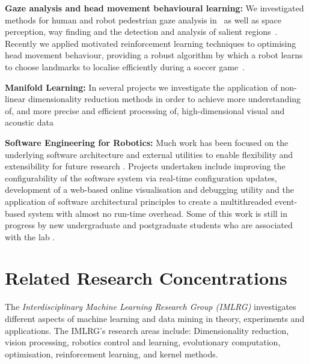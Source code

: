 \documentclass{llncs}
\begin{document}
\noindent\textbf{Gaze analysis and head movement behavioural learning:} We investigated methods for human and robot pedestrian gaze analysis in~\cite{JalalianEtAl_CAADRIA2011,WongEtAl2012} as well as space perception, way finding and the detection and analysis of salient regions~\cite{BhatiaEtAl2013,BhatiaChalupOstwald2013}. Recently we applied motivated reinforcement learning techniques to optimising head movement behaviour, providing a robust algorithm by which a robot learns to choose landmarks to localise efficiently during a soccer game~\cite{FountainEtAl2014}. 

\noindent\textbf{Manifold Learning:} In several projects we
investigate the application of non-linear dimensionality reduction
methods in order to achieve more understanding of, and more precise
and efficient processing of, high-dimensional visual and acoustic data \cite{ChalupEtAl2007b,WongEtAl2012,WongChalup2008}

\noindent\textbf{Software Engineering for Robotics:} Much work has been focused on the underlying software architecture and external utilities to enable flexibility and extensibility for future research \cite{Kulk2011c,HoulistonEtAlNUClear2016}. Projects undertaken include improving the configurability of the software system via real-time configuration updates, development of a web-based online visualisation and debugging utility \cite{AnnableEtAl2014} and the application of software architectural principles to create a multithreaded event-based system with almost no run-time overhead. Some of this work is still in progress by new undergraduate and postgraduate students who are associated with the lab \cite{BilleEtAl2016}.

\section{Related Research Concentrations}
The \emph{Interdisciplinary Machine Learning Research Group (IMLRG)} investigates different aspects of machine learning and data mining in theory, experiments and applications. The IMLRG's research areas include: Dimensionality reduction, vision processing, robotics control and learning,  evolutionary computation, optimisation, reinforcement learning, and kernel methods. %



\end{document}
